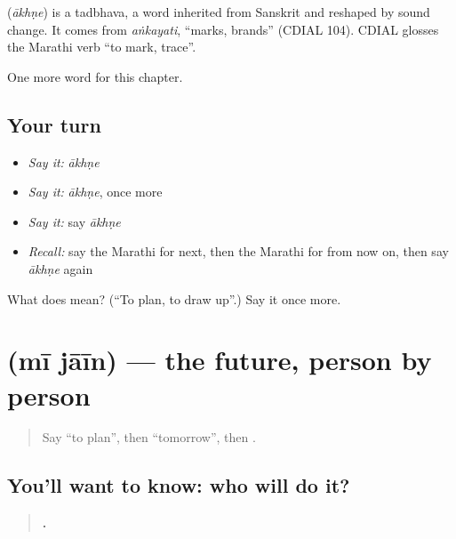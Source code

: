 \begin{cousinweb}
\textbf{} (\emph{ākhṇe}) is a tadbhava, a word inherited from Sanskrit and reshaped by sound change. It comes from \emph{aṅkayati}, \textquotedblleft{}marks, brands\textquotedblright{} (CDIAL 104). CDIAL glosses the Marathi verb \textquotedblleft{}to mark, trace\textquotedblright{}.
\end{cousinweb}

\begin{grammarlens}[title={What you've built}]
One more word for this chapter.
\end{grammarlens}

\subsection*{Your turn}
\begin{itemize}
\raggedright
  \item \emph{Say it:} \emph{ākhṇe}
  \item \emph{Say it:} \emph{ākhṇe}, once more
  \item \emph{Say it:} say \emph{ākhṇe}
  \item \emph{Recall:} say the Marathi for next, then the Marathi for from now on, then say \emph{ākhṇe} again
\end{itemize}

\begin{tcolorbox}[breakable,colback=teal!4,colframe=teal!35!black,title={Before you move on}]
What does  mean? (\textquotedblleft{}To plan, to draw up\textquotedblright{}.) Say it once more.
\end{tcolorbox}
\section[\texorpdfstring{\mr{मी} \mr{जाईन} (mī jāīn)}{मी जाईन (mī jāīn)}]{  (mī jāīn) — the future, person by person}

\label{lesson:MR-C160-jain}



\begin{quote}
Say \textquotedblleft{}to plan\textquotedblright{}, then \textquotedblleft{}tomorrow\textquotedblright{}, then \textbf{ }.
\end{quote}

\subsection*{You'll want to know: who will do it?}
\begin{quote}
\textbf{   .}
\end{quote}

